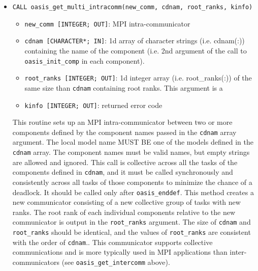 \begin{itemize}
  This routine sets up an MPI intra-communicator between two
  components, the local component and the component defined by
  the string {\tt cdnam}.  This call is collective
  across the tasks of the two components creating the intra-communicator only,
  and it must be called synchronously across all tasks of the two components
  to minimize the chance of a deadlock.  It should be called only after
  {\tt oasis\_enddef}.
  This method creates a new communicator consisting of a new collective group
  of tasks with new ranks.
  This communicator supports collective communications and is
  more typically used in MPI applications than inter-communicators
  (see {\tt oasis\_get\_intercomm} above).

  \vspace{0.2cm}
\item {\tt CALL oasis\_get\_multi\_intracomm(new\_comm, cdnam, root\_ranks, kinfo)}
  \begin{itemize}
  \item {\tt new\_comm [INTEGER; OUT]}: MPI intra-communicator
  \item {\tt cdnam [CHARACTER*; IN]}: 1d array of character strings (i.e. cdnam(:)) containing the name of the component (i.e. 2nd argument of the call to {\tt oasis\_init\_comp} in each component). 
  \item {\tt root\_ranks [INTEGER; OUT]}: 1d integer array (i.e. root\_ranks(:)) of the same size than {\tt cdnam} containing root ranks.  This argument is a 
  \item {\tt kinfo [INTEGER; OUT]}: returned error code
  \end{itemize}

  This routine sets up an MPI intra-communicator between two or more
  components defined by the component names passed in the {\tt cdnam} array
  argument.  The local model name MUST BE one of the
  models defined in the {\tt cdnam} array.  The component names must
  be valid names, but empty strings are allowed and ignored.
  This call is collective
  across all the tasks of the components defined in {\tt cdnam},
  and it must be called synchronously and consistently across all tasks of
  those components to minimize the chance of a deadlock.  It should be called only after
  {\tt oasis\_enddef}.
  This method creates a new communicator consisting of a new collective group
  of tasks with new ranks.  The root rank of each individual components relative
  to the new communicator is output in the {\tt root\_ranks} argument.
  The size of {\tt cdnam} and {\tt root\_ranks} should be identical,
  and the values of {\tt root\_ranks} are consistent with the order of {\tt cdnam}..
  This communicator supports collective communications and is
  more typically used in MPI applications than inter-communicators
  (see {\tt oasis\_get\_intercomm} above).
  

\end{itemize}
